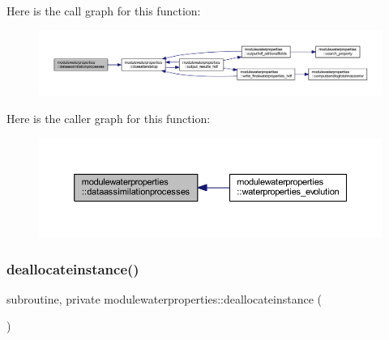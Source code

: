 Here is the call graph for this function\+:\nopagebreak
\begin{figure}[H]
\begin{center}
\leavevmode
\includegraphics[width=350pt]{namespacemodulewaterproperties_abdbc309080b92eb5274f0481166c683d_cgraph}
\end{center}
\end{figure}
Here is the caller graph for this function\+:\nopagebreak
\begin{figure}[H]
\begin{center}
\leavevmode
\includegraphics[width=350pt]{namespacemodulewaterproperties_abdbc309080b92eb5274f0481166c683d_icgraph}
\end{center}
\end{figure}
\mbox{\label{namespacemodulewaterproperties_afcf00b3b04c6e13ebfe955c7074bc924}} 
\subsubsection{\texorpdfstring{deallocateinstance()}{deallocateinstance()}}
{\footnotesize\ttfamily subroutine, private modulewaterproperties\+::deallocateinstance (\begin{DoxyParamCaption}{ }\end{DoxyParamCaption})\hspace{0.3cm}{\ttfamily [private]}}

